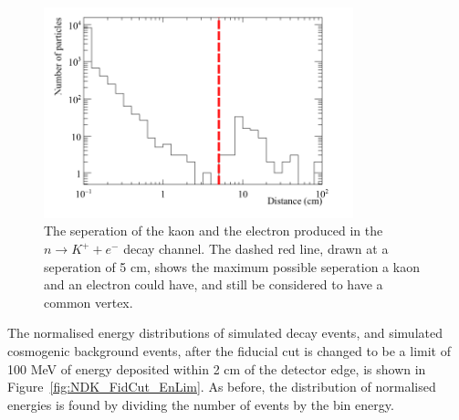 \begin{figure}[h!]
  \centering
  \includegraphics[width=0.8\textwidth]{NucleonDecay_KaonElecSep}
  \caption[The seperation of the kaon and the electron produced in the $n \rightarrow K^{+} + e^{-}$ decay channel]
          {The seperation of the kaon and the electron produced in the $n \rightarrow K^{+} + e^{-}$ decay channel. The dashed red line, drawn at a seperation of 5 cm, shows the maximum possible seperation a kaon and an electron could have, and still be considered to have a common vertex.}
  \label{fig:NDK_Sig_KEDist}
\end{figure}

The normalised energy distributions of simulated decay events, and simulated cosmogenic background events, after the fiducial cut is changed to be a limit of 100 MeV of energy deposited within 2 cm of the detector edge, is shown in Figure~\ref{fig:NDK_FidCut_EnLim}. As before, the distribution of normalised energies is found by dividing the number of events by the bin energy. \\


